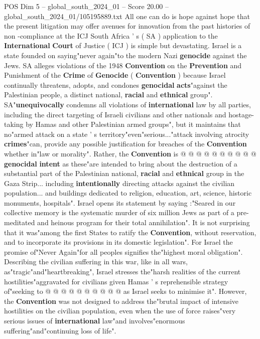 \begin{textsample}{POS Dim 5 – global\_south\_2024\_01 – Score 20.00 – global\_south\_2024\_01/105195889.txt}  \label{ex:f5_pos_010}
All one can do is hope against hope that the present litigation may offer avenues for innovation from the past histories of non -compliance at the ICJ South Africa ' s ( SA ) application to the \textbf{International} \textbf{Court} of Justice ( ICJ ) is simple but devastating.
Israel is a state founded on saying"never again"to the modern Nazi \textbf{genocide} against the Jews.
SA alleges violations of the 1948 \textbf{Convention} on the \textbf{Prevention} and Punishment of the \textbf{Crime} of \textbf{Genocide} ( \textbf{Convention} ) because Israel continually threatens, adopts, and condones \textbf{genocidal} \textbf{acts}"against the Palestinian people, a distinct national, \textbf{racial} and \textbf{ethnical} group".
SA"\textbf{unequivocally} condemns all violations of \textbf{international} law by all parties, including the direct targeting of Israeli civilians and other nationals and hostage-taking by Hamas and other Palestinian armed groups", but it maintains that no"armed attack on a state ' s territory"even"serious..."attack involving atrocity \textbf{crimes}"can, provide any possible justification for breaches of the \textbf{Convention} whether in"law or morality".
Rather, the \textbf{Convention} is @ @ @ @ @ @ @ @ @ @ \textbf{genocidal} \textbf{intent} as these"are intended to bring about the destruction of a substantial part of the Palestinian national, \textbf{racial} and \textbf{ethnical} group in the Gaza Strip... including \textbf{intentionally} directing attacks against the civilian population... and buildings dedicated to religion, education, art, science, historic monuments, hospitals".
Israel opens its statement by saying :"Seared in our collective memory is the systematic murder of six million Jews as part of a pre-meditated and heinous program for their total annihilation".
It is not surprising that it was"among the first States to ratify the \textbf{Convention}, without reservation, and to incorporate its provisions in its domestic legislation".
For Israel the promise of"Never Again"for all peoples signifies the"highest moral obligation".
Describing the civilian suffering in this war, like in all wars, as"tragic"and"heartbreaking", Israel stresses the"harsh realities of the current hostilities"aggravated for civilians given Hamas ' s reprehensible strategy of"seeking to @ @ @ @ @ @ @ @ @ @ as Israel seeks to minimise it".
However, the \textbf{Convention} was not designed to address the"brutal impact of intensive hostilities on the civilian population, even when the use of force raises"very serious issues of \textbf{international} law"and involves"enormous suffering"and"continuing loss of life".

\end{textsample}
